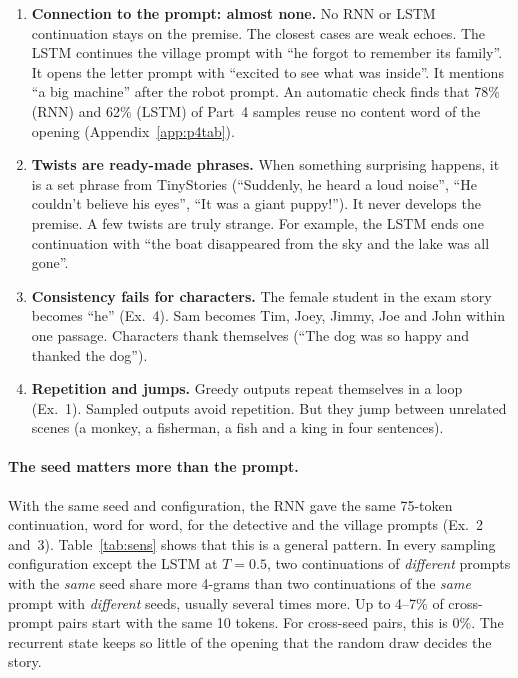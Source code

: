 \documentclass[11pt,a4paper]{article}
\begin{document}
\begin{table}[H]\centering
\caption{Plot-Twist criteria (mean over the 5 openings; Yes = 1, Partial = 0.5, No = 0).}\label{tab:p4}
{\small}
\end{table}

\begin{enumerate}
\item \textbf{Connection to the prompt: almost none.} No RNN or LSTM continuation stays on the
  premise. The closest cases are weak echoes. The LSTM continues the village prompt with ``he forgot
  to remember its family''. It opens the letter prompt with ``excited to see what was inside''. It
  mentions ``a big machine'' after the robot prompt. An automatic check finds that 78\% (RNN) and
  62\% (LSTM) of Part~4 samples reuse no content word of the opening (Appendix~\ref{app:p4tab}).
\item \textbf{Twists are ready-made phrases.} When something surprising happens, it is a set phrase
  from TinyStories (``Suddenly, he heard a loud noise'', ``He couldn't believe his eyes'',
  ``It was a giant puppy!''). It never develops the premise. A few twists are truly strange. For
  example, the LSTM ends one continuation with ``the boat disappeared from the sky and the lake was all gone''.
\item \textbf{Consistency fails for characters.} The female student in the exam story becomes ``he''
  (Ex.~4). Sam becomes Tim, Joey, Jimmy, Joe and John within one passage. Characters thank
  themselves (``The dog was so happy and thanked the dog'').
\item \textbf{Repetition and jumps.} Greedy outputs repeat themselves in a loop (Ex.~1). Sampled
  outputs avoid repetition. But they jump between unrelated scenes (a monkey, a fisherman, a fish
  and a king in four sentences).
\end{enumerate}

\paragraph{The seed matters more than the prompt.} With the same seed and configuration, the RNN
gave the same 75-token continuation, word for word, for the detective and the village prompts
(Ex.~2 and~3). Table~\ref{tab:sens} shows that this is a general pattern. In every sampling
configuration except the LSTM at $T=0.5$, two continuations of \emph{different} prompts with the
\emph{same} seed share more 4-grams than two continuations of the \emph{same} prompt with
\emph{different} seeds, usually several times more. Up to 4--7\% of cross-prompt pairs start with the same 10 tokens. For cross-seed
pairs, this is 0\%. The recurrent state keeps so little of the opening that the random draw
decides the story.
\end{document}
